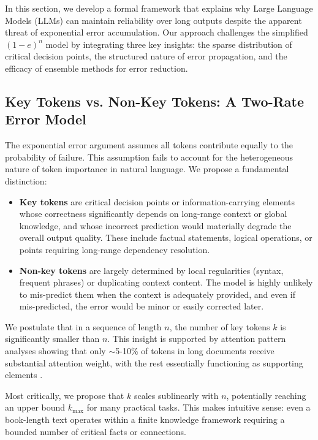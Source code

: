 \documentclass{article}
\begin{document}
In this section, we develop a formal framework that explains why Large Language Models (LLMs) can maintain reliability over long outputs despite the apparent threat of exponential error accumulation. Our approach challenges the simplified $(1-e)^n$ model by integrating three key insights: the sparse distribution of critical decision points, the structured nature of error propagation, and the efficacy of ensemble methods for error reduction.

\subsection{Key Tokens vs. Non-Key Tokens: A Two-Rate Error Model}

The exponential error argument assumes all tokens contribute equally to the probability of failure. This assumption fails to account for the heterogeneous nature of token importance in natural language. We propose a fundamental distinction:

\begin{itemize}
\item \textbf{Key tokens} are critical decision points or information-carrying elements whose correctness significantly depends on long-range context or global knowledge, and whose incorrect prediction would materially degrade the overall output quality. These include factual statements, logical operations, or points requiring long-range dependency resolution.

\item \textbf{Non-key tokens} are largely determined by local regularities (syntax, frequent phrases) or duplicating context content. The model is highly unlikely to mis-predict them when the context is adequately provided, and even if mis-predicted, the error would be minor or easily corrected later.
\end{itemize}

We postulate that in a sequence of length $n$, the number of key tokens $k$ is significantly smaller than $n$. This insight is supported by attention pattern analyses showing that only $\sim$5-10\% of tokens in long documents receive substantial attention weight, with the rest essentially functioning as supporting elements \citep{fang2024what}.

Most critically, we propose that $k$ scales sublinearly with $n$, potentially reaching an upper bound $k_{\max}$ for many practical tasks. This makes intuitive sense: even a book-length text operates within a finite knowledge framework requiring a bounded number of critical facts or connections.
\end{document}
